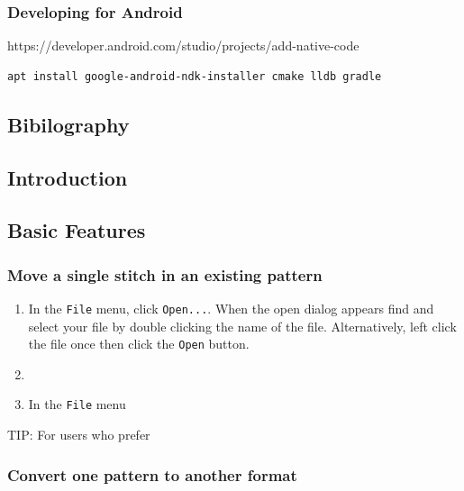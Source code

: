 \documentclass[a4paper, 11pt]{report}
\begin{document}
\hypertarget{developing-for-android}{%
\subsubsection{Developing for Android}\label{developing-for-android}}

https://developer.android.com/studio/projects/add-native-code

\begin{verbatim}
apt install google-android-ndk-installer cmake lldb gradle
\end{verbatim}

\hypertarget{bibilography}{%
\subsection{Bibilography}\label{bibilography}}

\hypertarget{introduction-1}{%
\subsection{Introduction}\label{introduction-1}}

\hypertarget{basic-features-1}{%
\subsection{Basic Features}\label{basic-features-1}}

\hypertarget{move-a-single-stitch-in-an-existing-pattern-1}{%
\subsubsection{Move a single stitch in an existing
pattern}\label{move-a-single-stitch-in-an-existing-pattern-1}}

\begin{enumerate}
\def\labelenumi{\arabic{enumi}.}
\item
  In the \texttt{File} menu, click \texttt{Open...}. When the open
  dialog appears find and select your file by double clicking the name
  of the file. Alternatively, left click the file once then click the
  \texttt{Open} button.
\item
\item
  In the \texttt{File} menu
\end{enumerate}

TIP: For users who prefer

\hypertarget{convert-one-pattern-to-another-format-1}{%
\subsubsection{Convert one pattern to another
format}\label{convert-one-pattern-to-another-format-1}}
\end{document}
